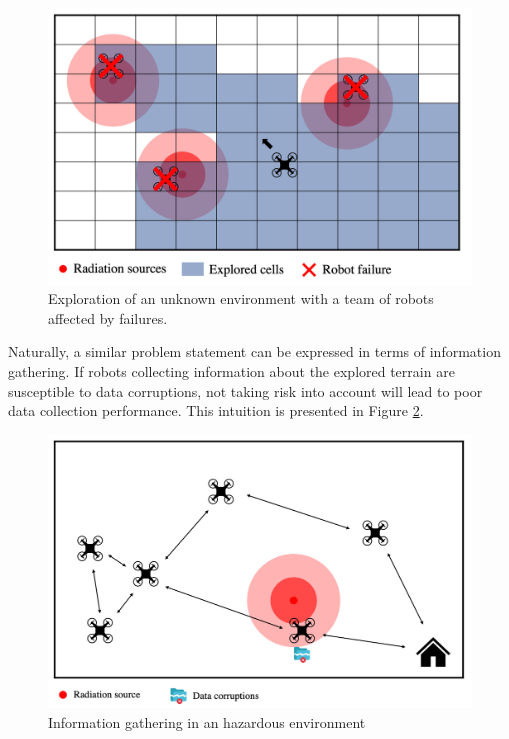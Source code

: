 \begin{figure}[H]
	\centering
    \includegraphics[width=0.85\columnwidth]{images/problemStatement2.png}
    \caption{Exploration of an unknown environment with a team of robots affected by failures.}
    \label{statementDORA2}
\end{figure}



Naturally, a similar problem statement can be expressed in terms of information gathering. If robots collecting information about the explored terrain are susceptible to data corruptions, not taking risk into account will lead to poor data collection performance. This intuition is presented in Figure \ref{statementRASS}.

\begin{figure}[h]
	\centering
    \includegraphics[width=0.95\columnwidth]{images/statementRASS.png}
    \caption{Information gathering in an hazardous environment}
    \label{statementRASS}
\end{figure}

